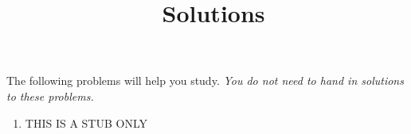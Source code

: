 \documentclass{article}
\title{\commonPSTitleZeroOneSeven\ Solutions}
\author{\commonAuthor}
\date{\commonDateZeroOneSeven}
\begin{document}
\maketitle
\thispagestyle{empty}

\noindent
The following problems will help you study.
\emph{You do not need to hand in solutions to these problems.}
\begin{enumerate} %
\item THIS IS A STUB ONLY
\end{enumerate}
\end{document}
